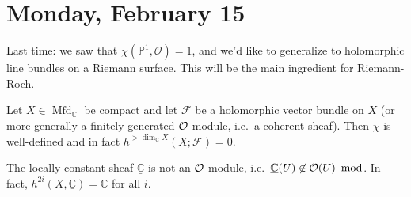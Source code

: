 \hypertarget{monday-february-15}{%
\section{Monday, February 15}\label{monday-february-15}}

\begin{remark}

Last time: we saw that \(\chi({\mathbb{P}}^1, {\mathcal{O}}) = 1\), and
we'd like to generalize to holomorphic line bundles on a Riemann
surface. This will be the main ingredient for Riemann-Roch.

\end{remark}

\begin{theorem}[?]

Let \(X \in {\operatorname{Mfd}}_{\mathbb{C}}\) be compact and let
\(\mathcal{F}\) be a holomorphic vector bundle on \(X\) (or more
generally a finitely-generated \({\mathcal{O}}{\hbox{-}}\)module, i.e.~a
coherent sheaf). Then \(\chi\) is well-defined and in fact
\(h^{> \dim_{\mathbb{C}}X}(X; \mathcal{F} ) = 0\).

\end{theorem}

\begin{remark}

The locally constant sheaf \(\underline{{\mathbb{C}}}\) is not an
\({\mathcal{O}}{\hbox{-}}\)module,
i.e.~\(\underline{{\mathbb{C}}}(U) \not\in {{{\mathcal{O}}(U)}{\hbox{-}}\operatorname{mod}}\).
In fact, \(h^{2i}(X, \underline{{\mathbb{C}}}) = {\mathbb{C}}\) for all
\(i\).

\end{remark}

